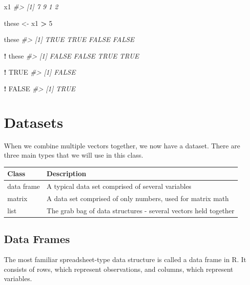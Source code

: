 \documentclass[]{book}
\newenvironment{Shaded}{\begin{snugshade}}{\end{snugshade}}
\newcommand{\CommentTok}[1]{\textcolor[rgb]{0.56,0.35,0.01}{\textit{#1}}}
\newcommand{\DecValTok}[1]{\textcolor[rgb]{0.00,0.00,0.81}{#1}}
\newcommand{\NormalTok}[1]{#1}
\newcommand{\OperatorTok}[1]{\textcolor[rgb]{0.81,0.36,0.00}{\textbf{#1}}}
\newcommand{\OtherTok}[1]{\textcolor[rgb]{0.56,0.35,0.01}{#1}}
\newcommand{\StringTok}[1]{\textcolor[rgb]{0.31,0.60,0.02}{#1}}
\theoremstyle{definition}
\theoremstyle{definition}
\theoremstyle{definition}
\theoremstyle{remark}
\begin{document}
\begin{Shaded}
\begin{Highlighting}[]

\NormalTok{x1}
\CommentTok{#> [1] 7 9 1 2}

\NormalTok{these <-}\StringTok{ }\NormalTok{x1 }\OperatorTok{>}\StringTok{ }\DecValTok{5}

\NormalTok{these}
\CommentTok{#> [1]  TRUE  TRUE FALSE FALSE}

\OperatorTok{!}\StringTok{ }\NormalTok{these}
\CommentTok{#> [1] FALSE FALSE  TRUE  TRUE}

\OperatorTok{!}\StringTok{ }\OtherTok{TRUE}
\CommentTok{#> [1] FALSE}

\OperatorTok{!}\StringTok{ }\OtherTok{FALSE}
\CommentTok{#> [1] TRUE}
\end{Highlighting}
\end{Shaded}

\hypertarget{datasets}{%
\section{Datasets}\label{datasets}}

When we combine multiple vectors together, we now have a dataset. There
are three main types that we will use in this class.

\begin{longtable}[]{@{}ll@{}}
\toprule
Class & Description\tabularnewline
\midrule
\endhead
data frame & A typical data set comprised of several
variables\tabularnewline
matrix & A data set comprised of only numbers, used for matrix
math\tabularnewline
list & The grab bag of data structures - several vectors held
together\tabularnewline
\bottomrule
\end{longtable}

\hypertarget{data-frames}{%
\subsection{Data Frames}\label{data-frames}}

The most familiar spreadsheet-type data structure is called a data frame
in R. It consists of rows, which represent observations, and columns,
which represent variables.
\end{document}
